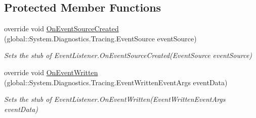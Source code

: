 \subsection*{Protected Member Functions}
\begin{DoxyCompactItemize}
\item 
override void \hyperlink{class_system_1_1_diagnostics_1_1_tracing_1_1_fakes_1_1_stub_event_listener_a28ddb015232ee80d522d8b2b766c3821}{On\-Event\-Source\-Created} (global\-::\-System.\-Diagnostics.\-Tracing.\-Event\-Source event\-Source)
\begin{DoxyCompactList}\small\item\em Sets the stub of Event\-Listener.\-On\-Event\-Source\-Created(\-Event\-Source event\-Source)\end{DoxyCompactList}\item 
override void \hyperlink{class_system_1_1_diagnostics_1_1_tracing_1_1_fakes_1_1_stub_event_listener_a55c26666b057e6e044f7d85704e50484}{On\-Event\-Written} (global\-::\-System.\-Diagnostics.\-Tracing.\-Event\-Written\-Event\-Args event\-Data)
\begin{DoxyCompactList}\small\item\em Sets the stub of Event\-Listener.\-On\-Event\-Written(\-Event\-Written\-Event\-Args event\-Data)\end{DoxyCompactList}\end{DoxyCompactItemize}
